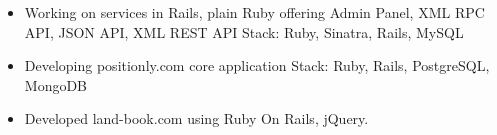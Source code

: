 \documentclass[10pt,a4paper,ragged2e]{altacv}
\begin{document}
\begin{itemize}
\item Working on services in Rails, plain Ruby offering Admin Panel,
XML RPC API, JSON API, XML REST API \newline
Stack: Ruby, Sinatra, Rails, MySQL
\end{itemize}

\begin{itemize}
\item Developing positionly.com core application \newline
Stack: Ruby, Rails, PostgreSQL, MongoDB
\end{itemize}


\begin{itemize}
\item Developed land-book.com using Ruby On Rails, jQuery.
\end{itemize}

\medskip

\clearpage

\nocite{*}

\end{document}
